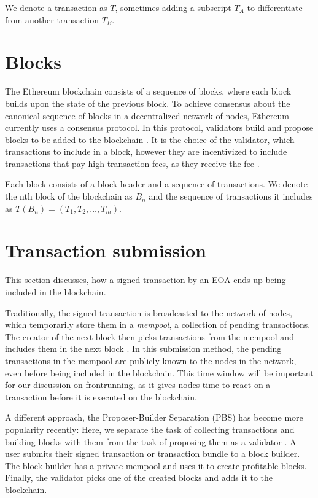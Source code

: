 \documentclass[draft,final]{vutinfth} %
\begin{document}
We denote a transaction as $T$, sometimes adding a subscript $T_A$ to differentiate from another transaction $T_B$.


\section{Blocks}

The Ethereum blockchain consists of a sequence of blocks, where each block builds upon the state of the previous block. To achieve consensus about the canonical sequence of blocks in a decentralized network of nodes, Ethereum currently uses a consensus protocol. In this protocol, validators build and propose blocks to be added to the blockchain \cite{noauthor_gasper_2024}. It is the choice of the validator, which transactions to include in a block, however they are incentivized to include transactions that pay high transaction fees, as they receive the fee \cite[p.8]{wood_ethereum_2024}.

Each block consists of a block header and a sequence of transactions. We denote the nth block of the blockchain as $B_n$ and the sequence of transactions it includes as $T(B_n) = (T_1, T_2, \dots, T_m)$.

\section{Transaction submission}

This section discusses, how a signed transaction by an EOA ends up being included in the blockchain.

Traditionally, the signed transaction is broadcasted to the network of nodes, which temporarily store them in a \emph{mempool}, a collection of pending transactions. The creator of the next block then picks transactions from the mempool and includes them in the next block \cite{eskandari_sok_2020}. In this submission method, the pending transactions in the mempool are publicly known to the nodes in the network, even before being included in the blockchain. This time window will be important for our discussion on frontrunning, as it gives nodes time to react on a transaction before it is executed on the blockchain.

A different approach, the Proposer-Builder Separation (PBS) has become more popularity recently: Here, we separate the task of collecting transactions and building blocks with them from the task of proposing them as a validator \cite{heimbach_ethereums_2023}. A user submits their signed transaction or transaction bundle to a block builder. The block builder has a private mempool and uses it to create profitable blocks. Finally, the validator picks one of the created blocks and adds it to the blockchain.
\end{document}
